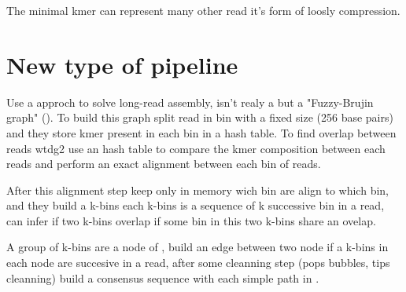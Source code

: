 \documentclass[main]{subfiles}
\begin{document}
The minimal kmer can represent many other read it's form of loosly compression.


\subsection{\miniasm}


\section{New type of pipeline \wtdbg} \label{section:sota:wtdbg}

Use a \DBG approch to solve long-read assembly, isn't realy a \DBG but a "Fuzzy-Brujin graph" (). To build this graph \wtdbg split read in bin with a fixed size (256 base pairs) and they store kmer present in each bin in a hash table.
To find overlap between reads wtdg2 use an hash table to compare the kmer composition between each reads and perform an exact alignment between each bin of reads. 

After this alignment step \wtdbg keep only in memory wich bin are align to which bin, and they build a k-bins each k-bins is a sequence of k successive bin in a read, \wtdbg can infer if two k-bins overlap if some bin in this two k-bins share an ovelap.

A group of k-bins are a node of , \wtdbg build an edge between two node if a k-bins in each node are succesive in a read, after some cleanning step (pops bubbles, tips cleanning) \wtdbg build a consensus sequence with each simple path in .

\end{document}
